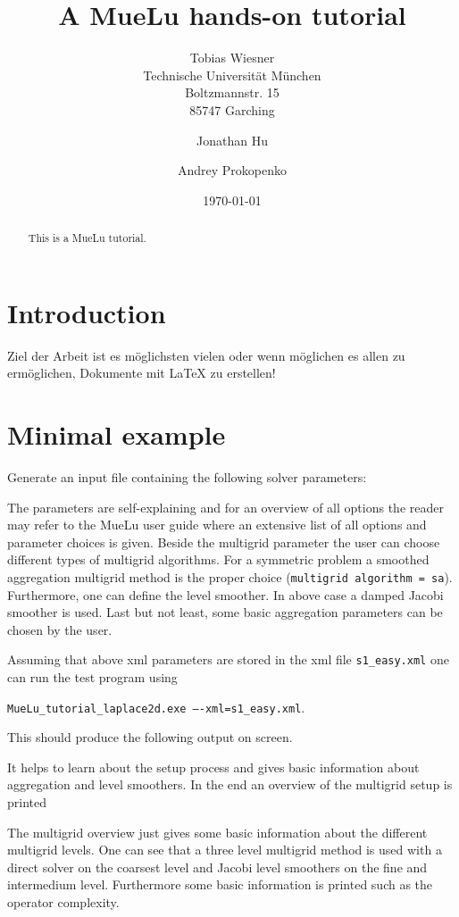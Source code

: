 \documentclass{article}
\title{A MueLu hands-on tutorial}
\author{Tobias Wiesner  \\
	Technische Universit\"at M\"unchen  \\
	Boltzmannstr. 15 \\
	85747 Garching \\
	\and 
  Jonathan Hu
  \and
  Andrey Prokopenko
	}
\date{\today}
\begin{document}
\maketitle


\begin{abstract}
This is a MueLu tutorial.
\end{abstract}

\section{Introduction}
Ziel der Arbeit ist es m\"oglichsten vielen oder wenn m\"oglichen es allen 
zu erm\"oglichen, Dokumente mit \LaTeX{} zu erstellen!


\section{Minimal example}

Generate an input file containing the following solver parameters: 
\small

\normalsize

The parameters are self-explaining and for an overview of all options the reader may refer to the MueLu user guide where an extensive list of all options and parameter choices is given.
Beside the multigrid parameter the user can choose different types of multigrid algorithms. For a symmetric problem a smoothed aggregation multigrid method is the proper choice (\texttt{multigrid algorithm = sa}). Furthermore, one can define the level smoother. In above case a damped Jacobi smoother is used. Last but not least, some basic aggregation parameters can be chosen by the user. 

Assuming that above xml parameters are stored in the xml file \texttt{s1\_easy.xml} one can run the test program using
\begin{center}
\texttt{MueLu\_tutorial\_laplace2d.exe ----xml=s1\_easy.xml}.
\end{center}
This should produce the following output on screen.

\small

\normalsize

It helps to learn about the setup process and gives basic information about aggregation and level smoothers. In the end an overview of the multigrid setup is printed

\small

\normalsize

The multigrid overview just gives some basic information about the different multigrid levels. One can see that a three level multigrid method is used with a direct solver on the coarsest level and Jacobi level smoothers on the fine and intermedium level. Furthermore some basic information is printed such as the operator complexity.
\end{document}
